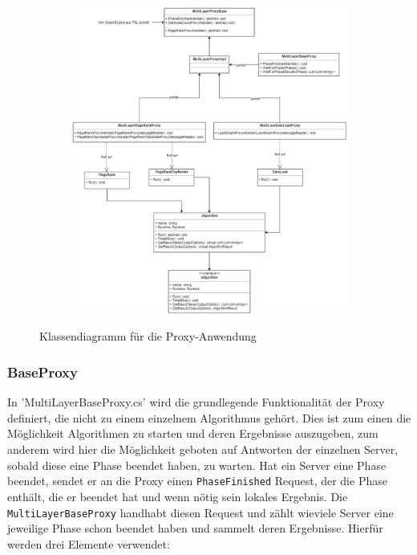 \begin{figure}
  \centering
  \begin{subfigure}[b]{1.0\textwidth}
    \includegraphics[width=1.0\linewidth]{img/Klassendiagramm-Proxy.png}
  \end{subfigure}
  \caption{Klassendiagramm für die Proxy-Anwendung}
  \label{proxyClass}
\end{figure}


\subsubsection{BaseProxy}

In 'MultiLayerBaseProxy.cs' wird die grundlegende Funktionalität der Proxy definiert, die nicht zu einem einzelnem Algorithmus gehört. Dies ist zum einen die Möglichkeit Algorithmen zu starten und deren Ergebnisse auszugeben, zum anderem wird hier die Möglichkeit geboten auf Antworten der einzelnen Server, sobald diese eine Phase beendet haben, zu warten.
Hat ein Server eine Phase beendet, sendet er an die Proxy einen \verb|PhaseFinished| Request, der die Phase enthält, die er beendet hat und wenn nötig sein lokales Ergebnis. Die \verb|MultiLayerBaseProxy| handhabt diesen Request und zählt wieviele Server eine jeweilige Phase schon beendet haben und sammelt deren Ergebnisse. Hierfür werden drei Elemente verwendet:

